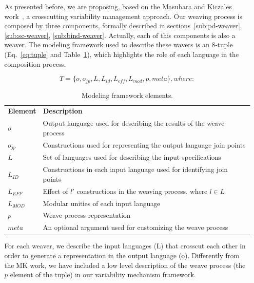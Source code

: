 \documentclass{llncs}
\begin{document}
As presented before, we are proposing, based on the Masuhara and Kiczales work~\cite{kiczales-ecoop-2003}, a crosscutting 
variability management approach. Our weaving process is composed by three components, formally described in sections~\ref{sub:pd-weaver}, \ref{sub:sc-weaver}, \ref{sub:bind-weaver}. Actually, each of this components is also a weaver. The modeling framework used to describe these wavers is an 8-tuple (Eq.~\ref{eq:tuple} and 
Table~\ref{tab:tup-01}), which highlights the role of each language in the composition process. 

\begin{equation}
T = \{o, o_{jp}, L, L_{id}, L_{eff}, L_{mod}, p, meta\}, where:
\label{eq:tuple}
\end{equation}

\begin{table}[h]
\begin{center}
\begin{small}
\caption{Modeling framework elements.} \label{tab:tup-01}
\begin{tabular}{ll}
  \hline\noalign{\smallskip}
  {\bf Element} & {\bf Description} \\ 
  \noalign{\smallskip}
  \hline
  \noalign{\smallskip}
  $o$              & Output language used for describing the results of the weave process \\ 
  $o_{jp}$       & Constructions used for representing the output language join points \\ 
  $L$              & Set of languages used for describing the input specifications \\ 
  $L_{ID}$      & Constructions in each input language used for identifying join points \\ 
  $L_{EFF}$   & Effect of $l'$ constructions in the weaving process, where $l \in L$ \\ 
  $L_{MOD}$  & Modular unities of each input language \\ 
  $p$               & Weave process representation \\ 
  $meta$         & An optional argument used for customizing the weave process \\ 
  \hline
\end{tabular}
\end{small}
\end{center}
\end{table}

For each weaver, we describe the input languages (L) that crosscut each other in order to generate 
a representation in the output language (o). Differently from the MK work, we have included a 
low level description of the weave process (the $p$ element of the tuple) in our variability 
mechanism framework. 
\end{document}
